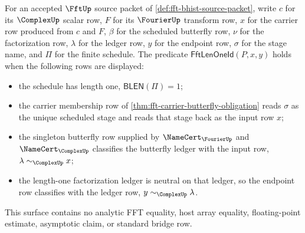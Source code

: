\begin{closurestatus}{\FftUp}
  \theoryclosure{\matureClosure}
  \formalstatus{\axiomCleanV}
\end{closurestatus}

\begin{definition}
\label{def:fft-length-one-identity-surface}
For an accepted $\FftUp$ source packet of \autoref{def:fft-bhist-source-packet}, write $c$ for its $\ComplexUp$ scalar row, $F$ for its $\FourierUp$ transform row, $x$ for the carrier row produced from $c$ and $F$, $\beta$ for the scheduled butterfly row, $\nu$ for the factorization row, $\lambda$ for the ledger row, $y$ for the endpoint row, $\sigma$ for the stage name, and $\Pi$ for the finite schedule. The predicate $\mathsf{FftLenOneId}(P,x,y)$ holds when the following rows are displayed:
\begin{itemize}
  \item the schedule has length one, $\mathsf{BLEN}(\Pi)=1$;
  \item the carrier membership row of \autoref{thm:fft-carrier-butterfly-obligation} reads $\sigma$ as the unique scheduled stage and reads that stage back as the input row $x$;
  \item the singleton butterfly row supplied by $\NameCert_{\FourierUp}$ and $\NameCert_{\ComplexUp}$ classifies the butterfly ledger with the input row, $\lambda\sim_{\ComplexUp} x$;
  \item the length-one factorization ledger is neutral on that ledger, so the endpoint row classifies with the ledger row, $y\sim_{\ComplexUp}\lambda$.
\end{itemize}
This surface contains no analytic FFT equality, host array equality, floating-point estimate, asymptotic claim, or standard bridge row.
\end{definition}

